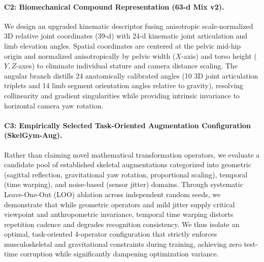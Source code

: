 \documentclass[runningheads]{llncs}
\begin{document}
\paragraph{C2: Biomechanical Compound Representation (63-d Mix v2).} We design an upgraded kinematic descriptor fusing anisotropic scale-normalized 3D relative joint coordinates (39-d) with 24-d kinematic joint articulation and limb elevation angles. Spatial coordinates are centered at the pelvic mid-hip origin and normalized anisotropically by pelvic width ($X$-axis) and torso height ($Y, Z$-axes) to eliminate individual stature and camera distance scaling. The angular branch distills 24 anatomically calibrated angles (10 3D joint articulation triplets and 14 limb segment orientation angles relative to gravity), resolving collinearity and gradient singularities while providing intrinsic invariance to horizontal camera yaw rotation.

\paragraph{C3: Empirically Selected Task-Oriented Augmentation Configuration (SkelGym-Aug).} Rather than claiming novel mathematical transformation operators, we evaluate a candidate pool of established skeletal augmentations categorized into geometric (sagittal reflection, gravitational yaw rotation, proportional scaling), temporal (time warping), and noise-based (sensor jitter) domains. Through systematic Leave-One-Out (LOO) ablation across independent random seeds, we demonstrate that while geometric operators and mild jitter supply critical viewpoint and anthropometric invariance, temporal time warping distorts repetition cadence and degrades recognition consistency. We thus isolate an optimal, task-oriented 4-operator configuration that strictly enforces musculoskeletal and gravitational constraints during training, achieving zero test-time corruption while significantly dampening optimization variance.
\end{document}
